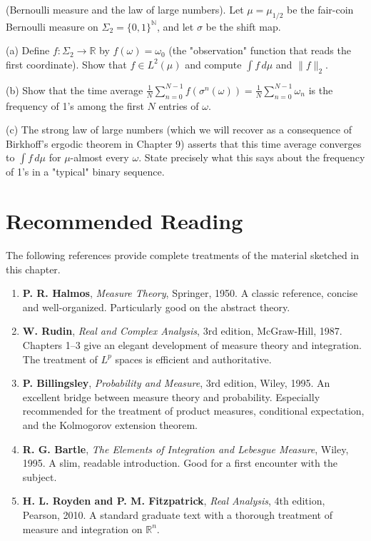 \begin{exercise}
(Bernoulli measure and the law of large numbers). Let $\mu = \mu_{1/2}$ be the fair-coin Bernoulli measure on $\Sigma_2 = \{0,1\}^{\mathbb{N}}$, and let $\sigma$ be the shift map.

(a) Define $f: \Sigma_2 \to \mathbb{R}$ by $f(\omega) = \omega_0$ (the "observation" function that reads the first coordinate). Show that $f \in L^2(\mu)$ and compute $\int f \, d\mu$ and $\|f\|_2$.

(b) Show that the time average $\frac{1}{N} \sum_{n=0}^{N-1} f(\sigma^n(\omega)) = \frac{1}{N} \sum_{n=0}^{N-1} \omega_n$ is the frequency of 1's among the first $N$ entries of $\omega$.

(c) The strong law of large numbers (which we will recover as a consequence of Birkhoff's ergodic theorem in Chapter 9) asserts that this time average converges to $\int f \, d\mu$ for $\mu$-almost every $\omega$. State precisely what this says about the frequency of 1's in a "typical" binary sequence.


\bigskip

\end{exercise}


\section*{Recommended Reading}

The following references provide complete treatments of the material sketched in this chapter.

\begin{enumerate}[nosep]
  \item \textbf{P. R. Halmos}, \textit{Measure Theory}, Springer, 1950. A classic reference, concise and well-organized. Particularly good on the abstract theory.

  \item \textbf{W. Rudin}, \textit{Real and Complex Analysis}, 3rd edition, McGraw-Hill, 1987. Chapters 1--3 give an elegant development of measure theory and integration. The treatment of $L^p$ spaces is efficient and authoritative.

  \item \textbf{P. Billingsley}, \textit{Probability and Measure}, 3rd edition, Wiley, 1995. An excellent bridge between measure theory and probability. Especially recommended for the treatment of product measures, conditional expectation, and the Kolmogorov extension theorem.

  \item \textbf{R. G. Bartle}, \textit{The Elements of Integration and Lebesgue Measure}, Wiley, 1995. A slim, readable introduction. Good for a first encounter with the subject.

  \item \textbf{H. L. Royden and P. M. Fitzpatrick}, \textit{Real Analysis}, 4th edition, Pearson, 2010. A standard graduate text with a thorough treatment of measure and integration on $\mathbb{R}^n$.
\end{enumerate}

